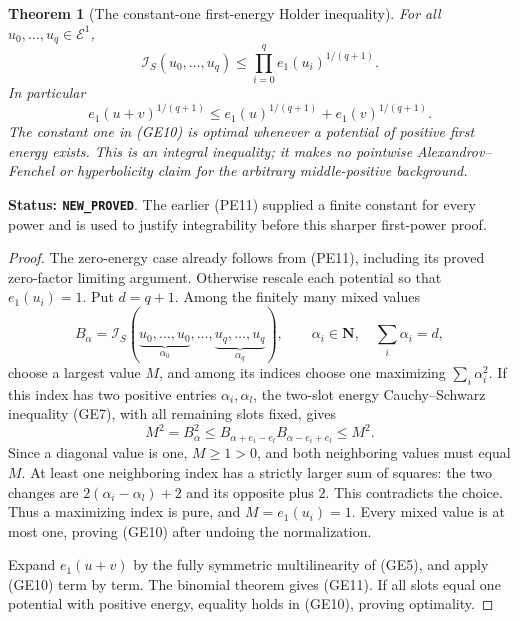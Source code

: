 \documentclass[11pt,a4paper]{article}
\numberwithin{equation}{section}
\newtheorem{theorem}{Theorem}[section]
\theoremstyle{definition}
\theoremstyle{remark}
\begin{document}
\begin{theorem}[The constant-one first-energy Holder inequality]
\label{thm:r11-optimal-first-energy-Holder}
For all $u_0,\ldots,u_q\in\mathcal E^1$,
\[
 \boxed{\quad
 \mathcal I_S(u_0,\ldots,u_q)
                    \leq\prod_{i=0}^q e_1(u_i)^{1/(q+1)}.
 \quad}
 \tag{GE10}
\]
In particular
\[
 e_1(u+v)^{1/(q+1)}
           \leq e_1(u)^{1/(q+1)}+e_1(v)^{1/(q+1)}.
 \tag{GE11}
\]
The constant one in (GE10) is optimal whenever a potential
of positive first energy exists. This is an integral inequality;
it makes no pointwise Alexandrov--Fenchel or hyperbolicity
claim for the arbitrary middle-positive background.
\end{theorem}

\noindent\textbf{Status: \texttt{NEW\_PROVED}}. The earlier
(PE11) supplied a finite constant for every power and is used
to justify integrability before this sharper first-power proof.

\begin{proof}
The zero-energy case already follows from (PE11), including
its proved zero-factor limiting argument. Otherwise rescale
each potential so that $e_1(u_i)=1$. Put $d=q+1$.
Among the finitely many mixed values
\[
 B_\alpha=\mathcal I_S(
             \underbrace{u_0,\ldots,u_0}_{\alpha_0},\ldots,
             \underbrace{u_q,\ldots,u_q}_{\alpha_q}),
       \qquad \alpha_i\in\mathbf N,\quad\sum_i\alpha_i=d,
\]
choose a largest value $M$, and among its indices choose one
maximizing $\sum_i\alpha_i^2$. If this index has two positive
entries $\alpha_i,\alpha_l$, the two-slot energy
Cauchy--Schwarz inequality (GE7), with all remaining slots
fixed, gives
\[
       M^2=B_\alpha^2
           \leq B_{\alpha+e_i-e_l}B_{\alpha-e_i+e_l}
           \leq M^2.
\]
Since a diagonal value is one, $M\geq1>0$, and both
neighboring values must equal $M$. At least one neighboring
index has a strictly larger sum of squares: the two changes
are $2(\alpha_i-\alpha_l)+2$ and its opposite plus $2$.
This contradicts the choice. Thus a maximizing index is
pure, and $M=e_1(u_i)=1$. Every mixed value is at most one,
proving (GE10) after undoing the normalization.

Expand $e_1(u+v)$ by the fully symmetric multilinearity of
(GE5), and apply (GE10) term by term. The binomial theorem
gives (GE11). If all slots equal one potential with positive
energy, equality holds in (GE10), proving optimality.
\end{proof}
\end{document}
